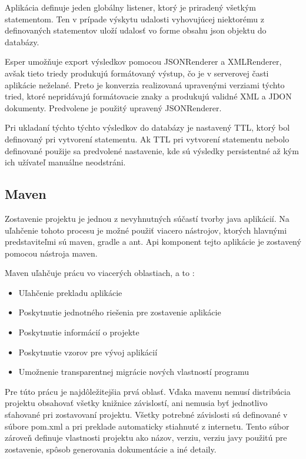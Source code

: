 		Aplikácia definuje jeden globálny listener, ktorý je priradený všetkým statementom. Ten v prípade výskytu udalosti vyhovujúcej niektorému z definovaných statementov uloží udalosť vo forme obsahu json objektu do databázy.
		
		Esper umožňuje export výsledkov pomocou JSONRenderer a XMLRenderer, avšak tieto triedy produkujú formátovaný výstup, čo je v serverovej časti aplikácie neželané. Preto je konverzia realizovaná upravenými verziami týchto tried, ktoré nepridávajú formátovacie znaky a produkujú validné XML a JDON dokumenty. Predvolene je použitý upravený JSONRenderer.
		
		Pri ukladaní týchto týchto výsledkov do databázy je nastavený TTL, ktorý bol definovaný pri vytvorení statementu. Ak TTL pri vytvorení statementu nebolo definované použije sa predvolené nastavenie, kde sú výsledky persistentné až kým ich užívateľ manuálne neodstráni.

	\subsection{Maven}
		Zostavenie projektu je jednou z nevyhnutných súčastí tvorby java aplikácií. Na uľahčenie tohoto procesu je možné použiť viacero nástrojov, ktorých hlavnými predstaviteľmi sú maven, gradle a ant. Api komponent tejto aplikácie je zostavený pomocou nástroja maven. 
		
		Maven uľahčuje prácu vo viacerých oblastiach, a to \cite{web:maven-doc}:
		\begin{itemize}
			\item Uľahčenie prekladu aplikácie
			\item Poskytnutie jednotného riešenia pre zostavenie aplikácie
			\item Poskytnutie informácií o projekte
			\item Poskytnutie vzorov pre vývoj aplikácií
			\item Umožnenie transparentnej migrácie nových vlastností programu
		\end{itemize}
		Pre túto prácu je najdôležitejšia prvá oblasť. Vďaka mavenu nemusí distribúcia projektu obsahovať všetky knižnice závislostí, ani nemusia byť jednotlivo sťahované pri zostavovaní projektu. Všetky potrebné závislosti sú definované v súbore pom.xml a pri preklade automaticky stiahnuté z internetu. Tento súbor zároveň definuje vlastnosti projektu ako názov, verziu, verziu javy použitú pre zostavenie, spôsob generovania dokumentácie a iné detaily.
		
